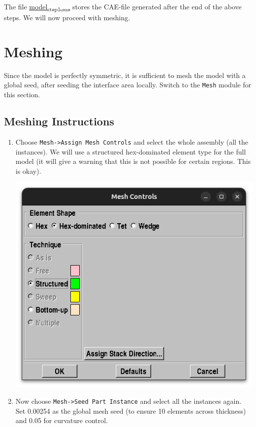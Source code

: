 \documentclass[11pt]{article}
\begin{document}
The file \href{https://github.com/Nidish96/Abaqus4Joints/blob/main/assets/assembly/model\_step1.cae}{model\textsubscript{step1.cae}} stores the CAE-file generated after the end of the above steps.
We will now proceed with meshing.
\section{Meshing}
\label{sec:org96b6ccd}
Since the model is perfectly symmetric, it is sufficient to mesh the model with a global seed, after seeding the interface area locally.
Switch to the \texttt{Mesh} module for this section.
\subsection{Meshing Instructions}
\label{sec:orgaee93d2}
\begin{enumerate}
\item Choose \texttt{Mesh->Assign Mesh Controls} and select the whole assembly (all the instances).
We will use a structured hex-dominated element type for the full model (it will give a warning that this is not possible for certain regions. This is okay).
\begin{center}
\includegraphics[width=.9\linewidth]{./figs/globmesh.png}
\end{center}
\item Now choose \texttt{Mesh->Seed Part Instance} and select all the instances again.
Set 0.00254 as the global mesh seed (to ensure 10 elements across thickness) and 0.05 for curvature control.
\begin{center}

\end{center}
\end{enumerate}
\end{document}
